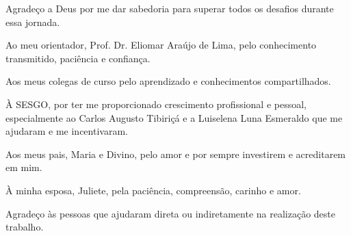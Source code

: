 \begin{agradecimentos}
  Agradeço a Deus por  me dar sabedoria para superar todos os desafios durante essa jornada. 

Ao meu orientador, Prof. Dr. Eliomar Araújo de Lima, pelo conhecimento transmitido, paciência e confiança.

Aos meus colegas de curso pelo aprendizado e conhecimentos compartilhados. 

À SESGO, por ter me proporcionado crescimento profissional e pessoal, especialmente ao Carlos Augusto Tibiriçá e a Luiselena Luna Esmeraldo que me ajudaram e me incentivaram.

Aos meus pais, Maria e Divino, pelo amor e por sempre investirem e acreditarem em mim.

À minha esposa, Juliete, pela paciência, compreensão, carinho e amor. 

Agradeço às pessoas que ajudaram direta ou indiretamente na
realização deste trabalho.

\end{agradecimentos}


